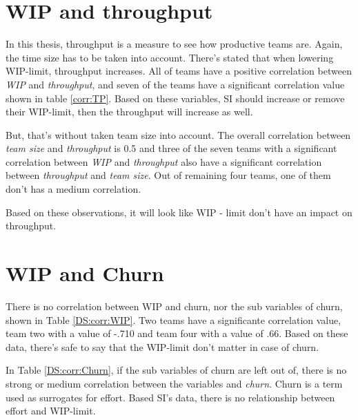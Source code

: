\documentclass[UKenglish]{ifimaster}  %
\begin{document}
\section{WIP and throughput} 
In this thesis, throughput is a measure to see how productive teams are. Again, the time size has to be taken into account. 
There's stated that when lowering WIP-limit, throughput increases. All of teams have a positive correlation between \textit{WIP} and \textit{throughput}, and seven of the teams have a significant correlation value shown in table \ref{corr:TP}. Based on these variables, SI should increase or remove their WIP-limit, then the throughput will increase as well. 

But, that's without taken team size into account. The overall correlation between  \textit{team size} and \textit{throughput} is 0.5 and three of the seven teams with a significant correlation between \textit{WIP} and \textit{throughput} also have a significant correlation between \textit{throughput} and \textit{team size}. Out of remaining four teams, one of them don't has a medium correlation. 

Based on these observations, it will look like WIP - limit don't have an impact on throughput. 

\section{WIP and Churn}
There is no correlation between WIP and churn, nor the sub variables of churn, shown in Table \ref{DS:corr:WIP}. Two teams have a significante correlation value, team two with a value of -.710 and team four with a value of .66. Based on these data, there's safe to say that the WIP-limit don't matter in case of churn. 

In Table \ref{DS:corr:Churn}, if the sub variables of churn are left out of, there is no strong or medium correlation between the variables and \textit{churn}. Churn is a term used as surrogates for effort. Based SI's data, there is no relationship between effort and WIP-limit.  


 
\end{document}
